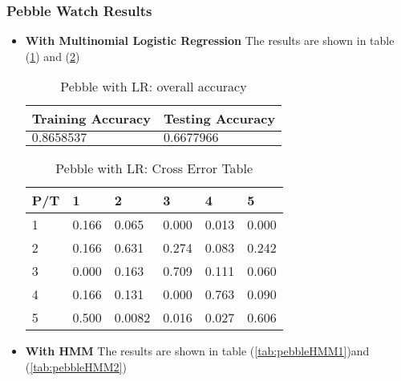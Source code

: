 \subsubsection{Pebble Watch Results}
\label{subsec:pebbleresult}
\begin{itemize}
\item \textbf{With Multinomial Logistic Regression} 
The results are shown in table (\ref{tab:pebbleLR1}) and (\ref{tab:pebbleLR2})

\begin{table}[H]
\begin{center}
\begin{tabular}{|l|l|}
      \hline
      Training Accuracy & Testing Accuracy\\
      \hline
      $0.8658537$ & $0.6677966$ \\
      \hline
\end{tabular}
\caption{Pebble with LR: overall accuracy}
\label{tab:pebbleLR1}
\end{center}
\end{table}

\begin{table}[H]
\begin{center}
\begin{tabular}{|l|l|l|l|l|l|}
      \hline
      P/T& 1 & 2 &3 & 4 & 5 \\
      \hline
      1 &0.166&0.065&0.000&0.013&0.000\\
      2 &0.166&0.631&0.274&0.083&0.242\\
      3 &0.000&0.163&0.709&0.111&0.060\\
      4 &0.166&0.131&0.000&0.763&0.090\\
      5 &0.500&0.0082&0.016&0.027&0.606\\
      \hline
\end{tabular}
\caption{Pebble with LR: Cross Error Table}
\label{tab:pebbleLR2}
\end{center}
\end{table}

\item \textbf{With HMM}
The results are shown in table (\ref{tab:pebbleHMM1})and (\ref{tab:pebbleHMM2})


\end{itemize}
